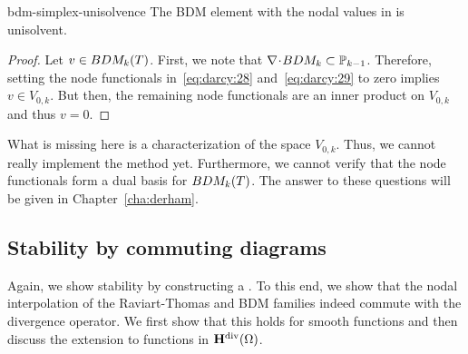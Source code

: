 \begin{Lemma}{bdm-simplex-unisolvence}
  The BDM element with the nodal values in
   is unisolvent.
\end{Lemma}

\begin{proof}
  Let $v\in BDM_k(\cell)$.
  First, we note that $\div BDM_k \subset \P_{k-1}$. Therefore,
  setting the
  node functionals in~\eqref{eq:darcy:28} and~\eqref{eq:darcy:29} to
  zero implies $v\in V_{0,k}$. But then, the remaining node
  functionals are an inner product on $V_{0,k}$ and thus $v=0$.
\end{proof}

\begin{remark}
  What is missing here is a characterization of the space
  $V_{0,k}$. Thus, we cannot really implement the method
  yet. Furthermore, we cannot verify that the node functionals form a
  dual basis for $BDM_k(\cell)$. The answer to these questions will be
  given in Chapter~\ref{cha:derham}.
\end{remark}

\subsection{Stability by commuting diagrams}

\begin{intro}
  Again, we show stability by constructing a . To this end, we show that the nodal interpolation of
  the Raviart-Thomas and BDM families indeed commute with the
  divergence operator. We first show that this holds for smooth
  functions and then discuss the extension to functions in
  $\Hdiv(\domain)$.
\end{intro}

